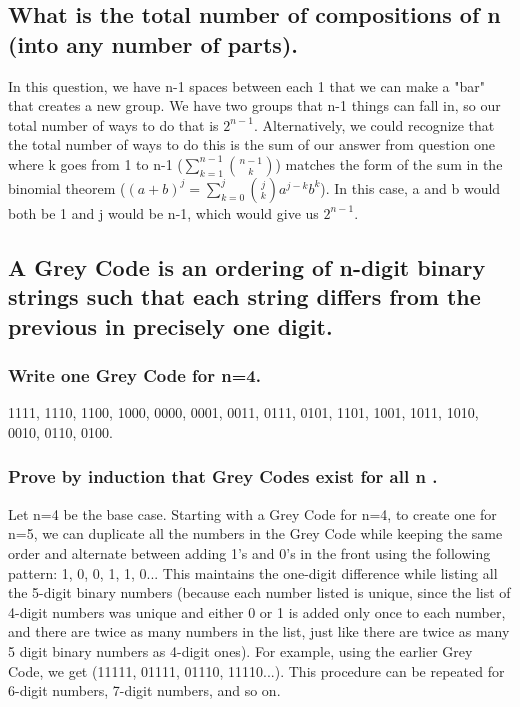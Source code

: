\documentclass[11pt,twosided]{article}
\begin{document}

\subsection{What is the total number of compositions of n (into any number of parts).}
In this question, we have n-1 spaces between each 1 that we can make a "bar" that creates a new group. We have two groups that n-1 things can fall in, so our total number of ways to do that is \(2^{n-1}\). Alternatively, we could recognize that the total number of ways to do this is the sum of our answer from question one where k goes from 1 to n-1 (\(\sum^{n-1}_{k=1}\binom{n-1}{k}\)) matches the form of the sum in the binomial theorem (\((a+b)^{j} = \sum^{j}_{k=0}\binom{j}{k}a^{j-k}b^{k}\)). In this case, a and b would both be 1 and j would be n-1, which would give us \(2^{n-1}\).


\subsection{A Grey Code is an ordering of n-digit binary strings such that each string differs from the previous in precisely one digit.}


\subsubsection{Write one Grey Code for n=4.}
1111, 1110, 1100, 1000, 0000, 0001, 0011, 0111, 0101, 1101, 1001, 1011, 1010, 0010, 0110, 0100.


\subsubsection{Prove by induction that Grey Codes exist for all n .}
Let n=4 be the base case. Starting with a Grey Code for n=4, to create one for n=5, we can duplicate all the numbers in the Grey Code while keeping the same order and alternate between adding 1's and 0's in the front using the following pattern: 1, 0, 0, 1, 1, 0... This maintains the one-digit difference while listing all the 5-digit binary numbers (because each number listed is unique, since the list of 4-digit numbers was unique and either 0 or 1 is added only once to each number, and there are twice as many numbers in the list, just like there are twice as many 5 digit binary numbers as 4-digit ones). For example, using the earlier Grey Code, we get (11111, 01111, 01110, 11110...). This procedure can be repeated for 6-digit numbers, 7-digit numbers, and so on.
\end{document}
